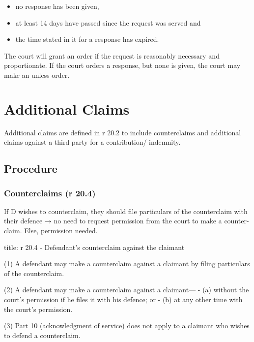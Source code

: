 \documentclass[
]{article}
\newenvironment{Shaded}{}{}
\newcommand{\NormalTok}[1]{#1}
\providecommand{\tightlist}{%
  \setlength{\itemsep}{0pt}\setlength{\parskip}{0pt}}
\begin{document}
\begin{itemize}
\tightlist
\item
  no response has been given,
\item
  at least 14 days have passed since the request was served and
\item
  the time stated in it for a response has expired.
\end{itemize}

The court will grant an order if the request is reasonably necessary and
proportionate. If the court orders a response, but none is given, the
court may make an unless order.

\hypertarget{additional-claims}{%
\section{Additional Claims}\label{additional-claims}}

Additional claims are defined in r 20.2 to include counterclaims and
additional claims against a third party for a contribution/ indemnity.

\hypertarget{procedure-1}{%
\subsection{Procedure}\label{procedure-1}}

\hypertarget{counterclaims-r-20.4}{%
\subsubsection{Counterclaims (r 20.4)}\label{counterclaims-r-20.4}}

If D wishes to counterclaim, they should file particulars of the
counterclaim with their defence → no need to request permission from the
court to make a counter-claim. Else, permission needed.

\begin{Shaded}
\begin{Highlighting}[]
\NormalTok{title: r 20.4 {-} Defendant’s counterclaim against the claimant}

\NormalTok{(1) A defendant may make a counterclaim against a claimant by filing particulars of the counterclaim.}

\NormalTok{(2) A defendant may make a counterclaim against a claimant—}
\NormalTok{{-} (a) without the court’s permission if he files it with his defence; or}
\NormalTok{{-} (b) at any other time with the court’s permission.}

\NormalTok{(3) Part 10 (acknowledgment of service) does not apply to a claimant who wishes to defend a counterclaim. }
\end{Highlighting}
\end{Shaded}
\end{document}
